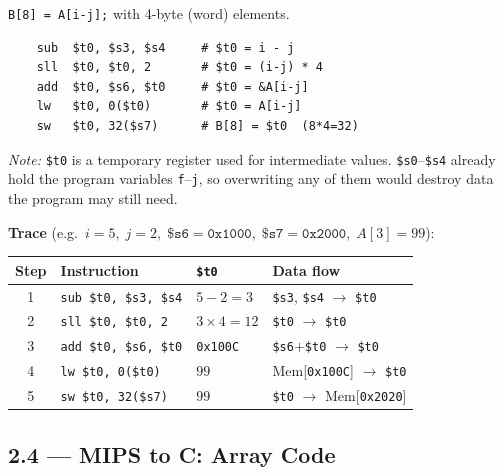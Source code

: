 \texttt{B[8] = A[i-j];} with 4-byte (word) elements.
\begin{verbatim}
    sub  $t0, $s3, $s4     # $t0 = i - j
    sll  $t0, $t0, 2       # $t0 = (i-j) * 4
    add  $t0, $s6, $t0     # $t0 = &A[i-j]
    lw   $t0, 0($t0)       # $t0 = A[i-j]
    sw   $t0, 32($s7)      # B[8] = $t0  (8*4=32)
\end{verbatim}
{\scriptsize\textit{Note:}
\texttt{\$t0} is a temporary register used for intermediate values.
\texttt{\$s0}--\texttt{\$s4} already hold the program variables
\texttt{f}--\texttt{j}, so overwriting any of them would destroy data
the program may still need.}

\medskip
{\small\textbf{Trace} (e.g.\ $i{=}5,\; j{=}2,\;
\texttt{\$s6}{=}\texttt{0x1000},\; \texttt{\$s7}{=}\texttt{0x2000},\;
A[3]{=}99$):}

\begin{center}
\small
\begin{tabular}{clll}
\toprule
\textbf{Step} & \textbf{Instruction} & \texttt{\$t0} & \textbf{Data flow} \\
\midrule
1 & \texttt{sub \$t0, \$s3, \$s4} & $5-2=3$
  & \texttt{\$s3}, \texttt{\$s4} $\to$ \texttt{\$t0} \\
2 & \texttt{sll \$t0, \$t0, 2}    & $3\times4=12$
  & \texttt{\$t0} $\to$ \texttt{\$t0} \\
3 & \texttt{add \$t0, \$s6, \$t0} & \texttt{0x100C}
  & \texttt{\$s6}$+$\texttt{\$t0} $\to$ \texttt{\$t0} \\
4 & \texttt{lw \$t0, 0(\$t0)}     & $99$
  & Mem[\texttt{0x100C}] $\to$ \texttt{\$t0} \\
5 & \texttt{sw \$t0, 32(\$s7)}    & $99$
  & \texttt{\$t0} $\to$ Mem[\texttt{0x2020}] \\
\bottomrule
\end{tabular}
\end{center}

\subsection*{2.4 --- MIPS to C: Array Code}
\hypertarget{sol-2.4}{}


